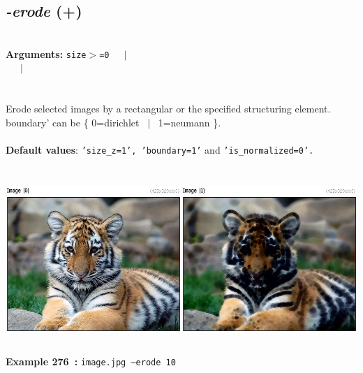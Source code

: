 \documentclass[a4paper,11pt,twoside]{book}
\begin{document}
\subsection{\emph{-erode} (+)}\vspace*{-0.5em}
~\\\textbf{Arguments: } 
{\small \texttt{size$>$=0}}~~~$|$\\
~~~$|$\\
\\~\\
Erode selected images by a rectangular or the specified structuring element.
boundary' can be \{ 0=dirichlet ~$|$~ 1=neumann \}.
~\\~\\\textbf{Default values}: {\small \texttt{'size\_z=1', 'boundary=1'} and \texttt{'is\_normalized=0'.}}
\begin{center}\includegraphics[keepaspectratio=true,height=7cm,width=\textwidth]{img/gmic_def276.jpg}\\
{\footnotesize \textbf{Example 276~:} \texttt{image.jpg --erode 10}}
\end{center}
\end{document}
